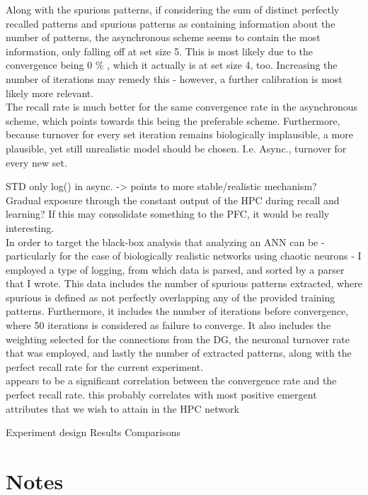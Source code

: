 Along with the spurious patterns, if considering the sum of distinct perfectly recalled patterns and spurious patterns as containing information about the number of patterns, the asynchronous scheme seems to contain the most information, only falling off at set size 5. This is most likely due to the convergence being 0 \% , which it actually is at set size 4, too. Increasing the number of iterations may remedy this - however, a further calibration is most likely more relevant.
\\

The recall rate is much better for the same convergence rate in the asynchronous scheme, which points towards this being the preferable scheme. Furthermore, because turnover for every set iteration remains biologically implausible, a more plausible, yet still unrealistic model should be chosen. I.e. Async., turnover for every new set.

STD only log() in async. -> points to more stable/realistic mechanism?
\\

Gradual exposure through the constant output of the HPC during recall and learning? If this may consolidate something to the PFC, it would be really interesting.
\\

In order to target the black-box analysis that analyzing an ANN can be - particularly for the case of biologically realistic networks using chaotic neurons - I employed a type of logging, from which data is parsed, and sorted by a parser that I wrote. This data includes the number of spurious patterns extracted, where spurious is defined as not perfectly overlapping any of the provided training patterns. Furthermore, it includes the number of iterations before convergence, where 50 iterations is considered as failure to converge. It also includes the weighting selected for the connections from the DG, the neuronal turnover rate that was employed, and lastly the number of extracted patterns, along with the perfect recall rate for the current experiment.
\\

appears to be a significant correlation between the convergence rate and the perfect recall rate. this probably correlates with most positive emergent attributes that we wish to attain in the HPC network


Experiment design
Results
Comparisons

\section*{Notes}

